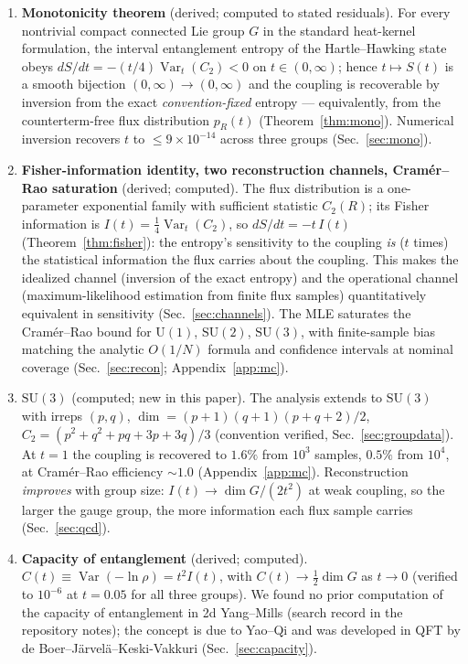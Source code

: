 \documentclass[11pt]{article}
\theoremstyle{remark}
\theoremstyle{plain}
\newcommand{\Var}{\operatorname{Var}}
\newcommand{\dG}{\dim G}
\begin{document}
\begin{enumerate}

\item \textbf{Monotonicity theorem} (derived; computed to stated residuals). For every nontrivial compact connected Lie group $G$ in the standard heat-kernel formulation, the interval entanglement entropy of the Hartle--Hawking state obeys $dS/dt = -(t/4)\Var_t(C_2) < 0$ on $t \in (0,\infty)$; hence $t \mapsto S(t)$ is a smooth bijection $(0,\infty) \to (0,\infty)$ and the coupling is recoverable by inversion from the exact \emph{convention-fixed} entropy --- equivalently, from the counterterm-free flux distribution $p_R(t)$ (Theorem~\ref{thm:mono}). Numerical inversion recovers $t$ to $\leq 9\times10^{-14}$ across three groups (Sec.~\ref{sec:mono}).

\item \textbf{Fisher-information identity, two reconstruction channels, Cram\'er--Rao saturation} (derived; computed). The flux distribution is a one-parameter exponential family with sufficient statistic $C_2(R)$; its Fisher information is $I(t) = \tfrac14\Var_t(C_2)$, so $dS/dt = -t\,I(t)$ (Theorem~\ref{thm:fisher}): the entropy's sensitivity to the coupling \emph{is} ($t$ times) the statistical information the flux carries about the coupling. This makes the idealized channel (inversion of the exact entropy) and the operational channel (maximum-likelihood estimation from finite flux samples) quantitatively equivalent in sensitivity (Sec.~\ref{sec:channels}). The MLE saturates the Cram\'er--Rao bound for $\mathrm{U}(1)$, $\mathrm{SU}(2)$, $\mathrm{SU}(3)$, with finite-sample bias matching the analytic $O(1/N)$ formula and confidence intervals at nominal coverage (Sec.~\ref{sec:recon}; Appendix~\ref{app:mc}).

\item \textbf{$\mathrm{SU}(3)$} (computed; new in this paper). The analysis extends to $\mathrm{SU}(3)$ with irreps $(p,q)$, $\dim = (p+1)(q+1)(p+q+2)/2$, $C_2 = (p^2+q^2+pq+3p+3q)/3$ (convention verified, Sec.~\ref{sec:groupdata}). At $t = 1$ the coupling is recovered to $1.6\%$ from $10^3$ samples, $0.5\%$ from $10^4$, at Cram\'er--Rao efficiency ${\sim}1.0$ (Appendix~\ref{app:mc}). Reconstruction \emph{improves} with group size: $I(t) \to \dG/(2t^2)$ at weak coupling, so the larger the gauge group, the more information each flux sample carries (Sec.~\ref{sec:qcd}).

\item \textbf{Capacity of entanglement} (derived; computed). $C(t) \equiv \Var(-\ln\rho) = t^2 I(t)$, with $C(t) \to \tfrac12\dG$ as $t \to 0$ (verified to $10^{-6}$ at $t = 0.05$ for all three groups). We found no prior computation of the capacity of entanglement in 2d Yang--Mills (search record in the repository notes); the concept is due to Yao--Qi \cite{YQ10} and was developed in QFT by de Boer--J\"arvel\"a--Keski-Vakkuri \cite{dBJK18} (Sec.~\ref{sec:capacity}).


\end{enumerate}
\end{document}
